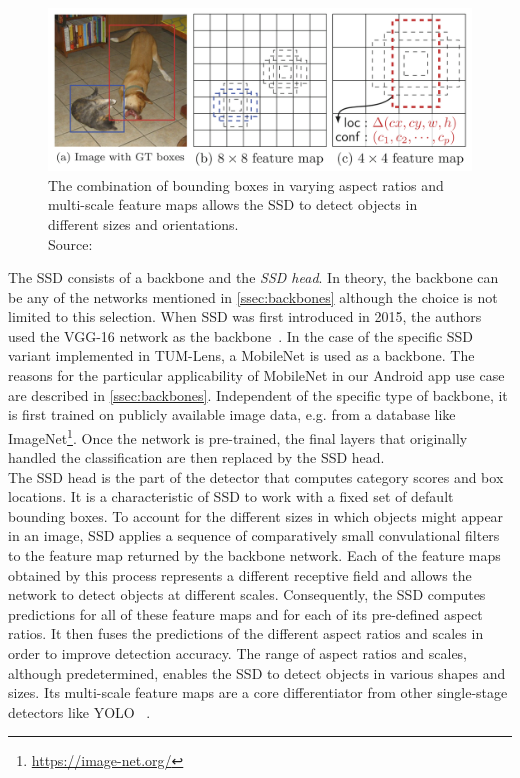 \documentclass[
			   fontsize=11pt,
               paper=a4,
               bibliography=totoc,
               idxtotoc,
               headsepline,
               footsepline,
               footinclude=false,
               BCOR=12mm,
               DIV=13,
               openany,   %
               oneside    %
               ]
               {scrbook}
\begin{document}
\begin{figure}[H] %
	\centering
	\includegraphics[width=\textwidth]{figures/ssd_feature_maps_scaling.png}
	\caption[Detecting Objects at Different Scales through SSD's Feature Maps]{The combination of bounding boxes in varying aspect ratios and multi-scale feature maps allows the SSD to detect objects in different sizes and orientations.\\
		\tiny{Source:~\cite{detectorSSD}}}
	\label{fig:ssdFeatureMapScaling} %
\end{figure}

\noindent The SSD consists of a backbone and the \textit{SSD head}. In theory, the backbone can be any of the networks mentioned in \autoref{ssec:backbones} although the choice is not limited to this selection. When SSD was first introduced  in 2015, the authors used the VGG-16 network as the backbone~\cite{detectorSSD}. In the case of the specific SSD variant implemented in TUM-Lens, a MobileNet is used as a backbone. The reasons for the particular applicability of MobileNet in our Android app use case are described in \autoref{ssec:backbones}. Independent of the specific type of backbone, it is first trained on publicly available image data, e.g. from a database like ImageNet\footnote{\url{https://image-net.org/}}. Once the network is pre-trained, the final layers that originally handled the classification are then replaced by the SSD head. \\

The SSD head is the part of the detector that computes category scores and box locations. It is a characteristic of SSD to work with a fixed set of default bounding boxes. To account for the different sizes in which objects might appear in an image, SSD applies a sequence of comparatively small convulational filters to the feature map returned by the backbone network. Each of the feature maps obtained by this process represents a different receptive field and allows the network to detect objects at different scales. Consequently, the SSD computes predictions for all of these feature maps and for each of its pre-defined aspect ratios. It then fuses the predictions of the different aspect ratios and scales in order to improve detection accuracy. The range of aspect ratios and scales, although predetermined, enables the SSD to detect objects in various shapes and sizes. Its multi-scale feature maps are a core differentiator from other single-stage detectors like YOLO~\cite{detectorSSD, detectorYOLOv1} .
\end{document}
